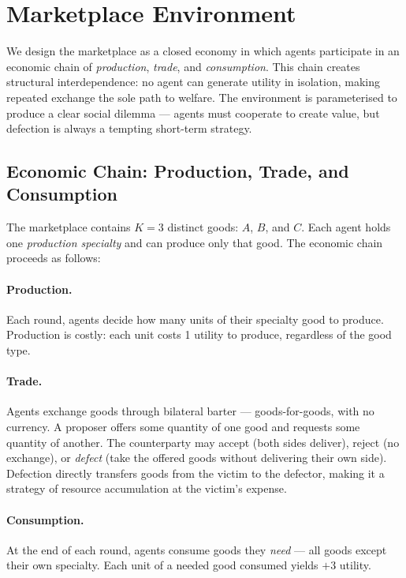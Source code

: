 \documentclass{article}
\begin{document}
\section{Marketplace Environment}
\label{sec:environment}

We design the marketplace as a closed economy in which agents participate in an economic chain of \textit{production}, \textit{trade}, and \textit{consumption}. This chain creates structural interdependence: no agent can generate utility in isolation, making repeated exchange the sole path to welfare. The environment is parameterised to produce a clear social dilemma --- agents must cooperate to create value, but defection is always a tempting short-term strategy.

\subsection{Economic Chain: Production, Trade, and Consumption}

The marketplace contains $K = 3$ distinct goods: $A$, $B$, and $C$. Each agent holds one \textit{production specialty} and can produce only that good. The economic chain proceeds as follows:

\paragraph{Production.} Each round, agents decide how many units of their specialty good to produce. Production is costly: each unit costs 1 utility to produce, regardless of the good type.

\paragraph{Trade.} Agents exchange goods through bilateral barter --- goods-for-goods, with no currency. A proposer offers some quantity of one good and requests some quantity of another. The counterparty may accept (both sides deliver), reject (no exchange), or \textit{defect} (take the offered goods without delivering their own side). Defection directly transfers goods from the victim to the defector, making it a strategy of resource accumulation at the victim's expense.

\paragraph{Consumption.} At the end of each round, agents consume goods they \textit{need} --- all goods except their own specialty. Each unit of a needed good consumed yields $+3$ utility.
\end{document}
